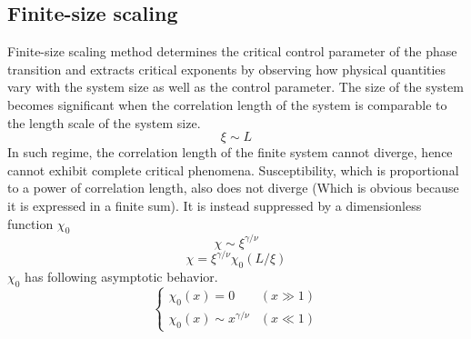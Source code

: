 \documentclass[fleqn]{article}
\begin{document}
\subsection{Finite-size scaling}
Finite-size scaling method determines the critical control parameter of the phase transition and extracts critical exponents by observing how physical quantities vary with the system size as well as the control parameter. The size of the system becomes significant when the correlation length of the system is comparable to the length scale of the system size.
\begin{equation}
\xi \sim L
\end{equation}
In such regime, the correlation length of the finite system cannot diverge, hence cannot exhibit complete critical phenomena. Susceptibility, which is proportional to a power of correlation length, also does not diverge (Which is obvious because it is expressed in a finite sum). It is instead suppressed by a dimensionless function $\chi_0$
\begin{equation}
\chi \sim \xi^{\gamma/\nu}
\end{equation}
\begin{equation}
\chi = \xi^{\gamma/\nu} \chi_0 (L/\xi)
\end{equation}
$\chi_0$ has following asymptotic behavior.
\begin{equation}
\begin{cases}
\chi_0 (x) = 0 & \left( x \gg 1 \right)  \\
\chi_0 (x) \sim x^{\gamma/\nu} & \left( x \ll 1 \right) 
\end{cases}
\end{equation}
\end{document}
